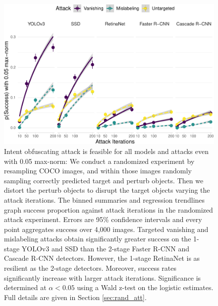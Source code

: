 \begin{figure}[tb]

{\centering \includegraphics[width=1\linewidth]{imgs/success_trend_graph-normed} 

}

\caption{Intent obfuscating attack is feasible for all models and attacks even with 0.05 max-norm:  We conduct a randomized experiment by resampling COCO images, and within those images randomly sampling correctly predicted target and perturb objects. Then we distort the perturb objects to disrupt the target objects varying the attack iterations. The binned summaries and regression trendlines graph success proportion against attack iterations in the randomized attack experiment. Errors are 95\% confidence intervals and every point aggregates success over 4,000 images. Targeted vanishing and mislabeling attacks obtain significantly greater success on the 1-stage YOLOv3 and SSD than the 2-stage Faster R-CNN and Cascade R-CNN detectors. However, the 1-stage RetinaNet is as resilient as the 2-stage detectors. Moreover, success rates significantly increase with larger attack iterations. Significance is determined at $\alpha < 0.05$ using a Wald z-test on the logistic estimates. Full details are given in Section \ref{sec:rand_att}.}\label{fig:success_trend_graph_normed}
\end{figure}
